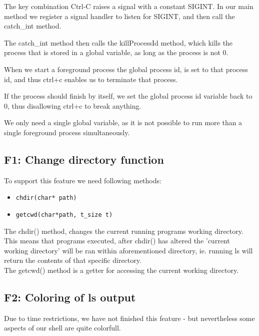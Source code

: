 The key combination Ctrl-C raises a signal with a constant SIGINT.
In our main method we register a signal handler to listen for SIGINT, and then call the catch\_int method.

The catch\_int method then calls the killProcessId method, which kills the process that is stored in a global variable, as long as the process is not 0.

When we start a foreground process the global process id, is set to that process id, and thus ctrl+c enables us to terminate that process.

If the process should finish by itself, we set the global process id variable back to 0, thus disallowing ctrl+c to break anything.

We only need a single global variable, as it is not possible to run more than a single foreground process simultaneously. 

\subsection{F1: Change directory function}
To support this feature we need following methods:
\begin{itemize}
\item \begin{verbatim}chdir(char* path)
\end{verbatim}
\item \begin{verbatim}getcwd(char*path, t_size t)
\end{verbatim}
\end{itemize}
The chdir() method, changes the current running programs working directory. This means that programs executed, after chdir() has altered the 'current working directory' will be ran within aforementioned directory, ie. running ls will return the contents of that specific directory.\\

The getcwd() method is a getter for accessing the current working directory.

\subsection{F2: Coloring of ls output}
Due to time restrictions, we have not finished this feature - but nevertheless some aspects of our  shell are quite colorfull.